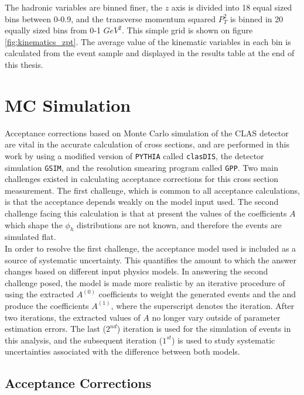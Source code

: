 The hadronic variables are binned finer, the $z$ axis is divided into 18 equal sized bins between 0-0.9, and the transverse momentum squared $P_T^2$ is binned in 20 equally sized bins from 0-1 $GeV^2$.  This simple grid is shown on figure \ref{fig:kinematics_zpt}.  The average value of the kinematic variables in each bin is calculated from the event sample and displayed in the results table at the end of this thesis.

\section{MC Simulation}
Acceptance corrections based on Monte Carlo simulation of the CLAS detector are vital in the accurate calculation of cross sections, and are performed in this work by using a modified version of \texttt{PYTHIA} called \texttt{clasDIS}, the detector simulation \texttt{GSIM}, and the resolution smearing program called \texttt{GPP}.  Two main challenges existed in calculating acceptance corrections for this cross section measurement.  The first challenge, which is common to all acceptance calculations, is that the acceptance depends weakly on the model input used.  The second challenge facing this calculation is that at present the values of the coefficients $A$ which shape the $\phi_h$ distributions are not known, and therefore the events are simulated flat.  \\  

In order to resolve the first challenge, the acceptance model used is included as a source of systematic uncertainty.  This quantifies the amount to which the answer changes based on different input physics models.  In answering the second challenge posed, the model is made more realistic by an iterative procedure of using the extracted $A^{(0)}$ coefficients to weight the generated events and the and produce the coefficients $A^{(1)}$, where the superscript denotes the iteration.  After two iterations, the extracted values of $A$ no longer vary outside of parameter estimation errors.  The last ($2^{nd}$) iteration is used for the simulation of events in this analysis, and the subsequent iteration ($1^{st}$) is used to study systematic uncertainties associated with the difference between both models.  \\

\subsection{Acceptance Corrections}

